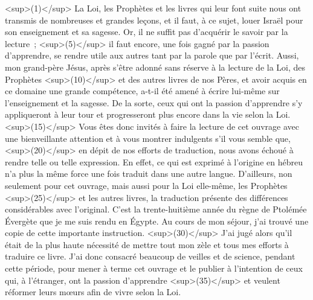   
  
    
      <sup>(1)</sup> La Loi, les Prophètes et les livres qui leur font suite nous ont transmis de nombreuses et grandes leçons, et il faut, à ce sujet, louer Israël pour son enseignement et sa sagesse. Or, il ne suffit pas d’acquérir le savoir par la lecture ; <sup>(5)</sup> il faut encore, une fois gagné par la passion d’apprendre, se rendre utile aux autres tant par la parole que par l’écrit. Aussi, mon grand-père Jésus, après s’être adonné sans réserve à la lecture de la Loi, des Prophètes <sup>(10)</sup> et des autres livres de nos Pères, et avoir acquis en ce domaine une grande compétence, a-t-il été amené à écrire lui-même sur l’enseignement et la sagesse. De la sorte, ceux qui ont la passion d’apprendre s’y appliqueront à leur tour et progresseront plus encore dans la vie selon la Loi.
      <sup>(15)</sup> Vous êtes donc invités à faire la lecture de cet ouvrage avec une bienveillante attention et à vous montrer indulgents s’il vous semble que, <sup>(20)</sup> en dépit de nos efforts de traduction, nous avons échoué à rendre telle ou telle expression. En effet, ce qui est exprimé à l’origine en hébreu n’a plus la même force une fois traduit dans une autre langue. D’ailleurs, non seulement pour cet ouvrage, mais aussi pour la Loi elle-même, les Prophètes <sup>(25)</sup> et les autres livres, la traduction présente des différences considérables avec l’original.
      C’est la trente-huitième année du règne de Ptolémée Évergète que je me suis rendu en Égypte. Au cours de mon séjour, j’ai trouvé une copie de cette importante instruction. <sup>(30)</sup> J’ai jugé alors qu’il était de la plus haute nécessité de mettre tout mon zèle et tous mes efforts à traduire ce livre. J’ai donc consacré beaucoup de veilles et de science, pendant cette période, pour mener à terme cet ouvrage et le publier à l’intention de ceux qui, à l’étranger, ont la passion d’apprendre <sup>(35)</sup> et veulent réformer leurs mœurs afin de vivre selon la Loi.
